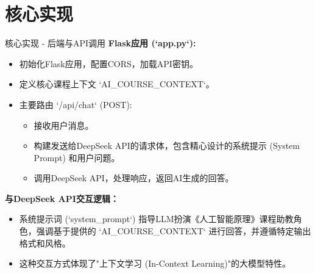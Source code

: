 \documentclass{beamer}
\begin{document}
\section{核心实现}
\begin{frame}{核心实现 - 后端与API调用}
  \textbf{Flask应用 (`app.py`):}
  \begin{itemize}
    \item 初始化Flask应用，配置CORS，加载API密钥。
    \item 定义核心课程上下文 `AI_COURSE_CONTEXT`。
    \item 主要路由 `/api/chat` (POST):
      \begin{itemize}
        \item 接收用户消息。
        \item 构建发送给DeepSeek API的请求体，包含精心设计的系统提示 (System Prompt) 和用户问题。
        \item 调用DeepSeek API，处理响应，返回AI生成的回答。
      \end{itemize}
  \end{itemize}
  \textbf{与DeepSeek API交互逻辑：}
  \begin{itemize}
    \item 系统提示词 (`system_prompt`) 指导LLM扮演《人工智能原理》课程助教角色，强调基于提供的 `AI_COURSE_CONTEXT` 进行回答，并遵循特定输出格式和风格。
    \item 这种交互方式体现了"上下文学习 (In-Context Learning)"的大模型特性。
  \end{itemize}
\end{frame}
\end{document}
